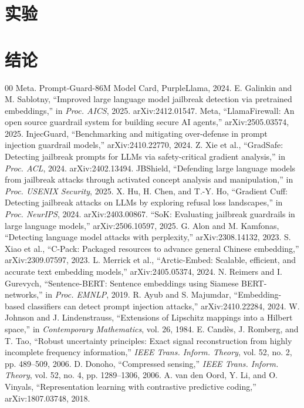 \documentclass[conference]{IEEEtran}
\begin{document}
\section{实验}

\section{结论}

\begin{thebibliography}{00}
 Meta. Prompt-Guard-86M Model Card, PurpleLlama, 2024.
 E. Galinkin and M. Sablotny, ``Improved large language model jailbreak detection via pretrained embeddings,'' in \textit{Proc. AICS}, 2025. arXiv:2412.01547.
 Meta, ``LlamaFirewall: An open source guardrail system for building secure AI agents,'' arXiv:2505.03574, 2025.
 InjecGuard, ``Benchmarking and mitigating over-defense in prompt injection guardrail models,'' arXiv:2410.22770, 2024.
 Z. Xie et al., ``GradSafe: Detecting jailbreak prompts for LLMs via safety-critical gradient analysis,'' in \textit{Proc. ACL}, 2024. arXiv:2402.13494.
 JBShield, ``Defending large language models from jailbreak attacks through activated concept analysis and manipulation,'' in \textit{Proc. USENIX Security}, 2025.
 X. Hu, H. Chen, and T.-Y. Ho, ``Gradient Cuff: Detecting jailbreak attacks on LLMs by exploring refusal loss landscapes,'' in \textit{Proc. NeurIPS}, 2024. arXiv:2403.00867.
 ``SoK: Evaluating jailbreak guardrails in large language models,'' arXiv:2506.10597, 2025.
 G. Alon and M. Kamfonas, ``Detecting language model attacks with perplexity,'' arXiv:2308.14132, 2023.
 S. Xiao et al., ``C-Pack: Packaged resources to advance general Chinese embedding,'' arXiv:2309.07597, 2023.
 L. Merrick et al., ``Arctic-Embed: Scalable, efficient, and accurate text embedding models,'' arXiv:2405.05374, 2024.
 N. Reimers and I. Gurevych, ``Sentence-BERT: Sentence embeddings using Siamese BERT-networks,'' in \textit{Proc. EMNLP}, 2019.
 R. Ayub and S. Majumdar, ``Embedding-based classifiers can detect prompt injection attacks,'' arXiv:2410.22284, 2024.
 W. Johnson and J. Lindenstrauss, ``Extensions of Lipschitz mappings into a Hilbert space,'' in \textit{Contemporary Mathematics}, vol. 26, 1984.
 E. Cand\`{e}s, J. Romberg, and T. Tao, ``Robust uncertainty principles: Exact signal reconstruction from highly incomplete frequency information,'' \textit{IEEE Trans. Inform. Theory}, vol. 52, no. 2, pp. 489--509, 2006.
 D. Donoho, ``Compressed sensing,'' \textit{IEEE Trans. Inform. Theory}, vol. 52, no. 4, pp. 1289--1306, 2006.
 A. van den Oord, Y. Li, and O. Vinyals, ``Representation learning with contrastive predictive coding,'' arXiv:1807.03748, 2018.
\end{thebibliography}
\end{document}

